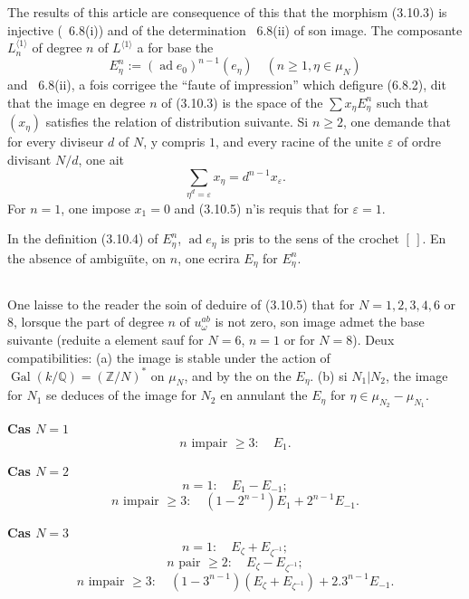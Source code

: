 \documentclass[11pt,a4paper]{article}
\theoremstyle{plain}
\theoremstyle{definition}
\DeclareMathOperator{\Gal}{Gal}
\DeclareMathOperator{\ad}{ad}
\newcommand{\Q}{\mathbb{Q}}
\newcommand{\Z}{\mathbb{Z}}
\begin{document}
The results of this article are consequence of this that the morphism (3.10.3) is injective (\cite{1}~6.8(i)) and of the determination \cite{1}~6.8(ii) of son image. The composante $L^{\langle 1 \rangle}_n$ of degree $n$ of $L^{\langle 1 \rangle}$ a for base the
\begin{equation}\label{eq:3.10.4}
E_\eta^n := (\ad e_0)^{n-1}(e_\eta) \quad (n \geq 1, \eta \in \mu_N)
\end{equation}
and \cite{1}~6.8(ii), a fois corrigee the ``faute of impression'' which defigure (6.8.2), dit that the image en degree $n$ of (3.10.3) is the space of the $\sum x_\eta E_\eta^n$ such that $(x_\eta)$ satisfies the relation of distribution suivante. Si $n \geq 2$, one demande that for every diviseur $d$ of $N$, y compris $1$, and every racine of the unite $\varepsilon$ of ordre divisant $N/d$, one ait
\begin{equation}\label{eq:3.10.5}
\sum_{\eta^d = \varepsilon} x_\eta = d^{n-1} x_\varepsilon.
\end{equation}
For $n=1$, one impose $x_1 = 0$ and (3.10.5) n'is requis that for $\varepsilon = 1$.

In the definition (3.10.4) of $E_\eta^n$, $\ad e_\eta$ is pris to the sens of the crochet $[\,]$. En the absence of ambigu\"{\i}te, on $n$, one ecrira $E_\eta$ for $E_\eta^n$.

\subsection{}
One laisse to the reader the soin of deduire of (3.10.5) that for $N=1,2,3,4,6$ or $8$, lorsque the part of degree $n$ of $u_\omega^{ab}$ is not zero, son image admet the base suivante (reduite a element sauf for $N=6$, $n=1$ or for $N=8$). Deux compatibilities: (a) the image is stable under the action of $\Gal(k/\Q) = (\Z/N)^\ast$ on $\mu_N$, and by the on the $E_\eta$. (b) si $N_1 | N_2$, the image for $N_1$ se deduces of the image for $N_2$ en annulant the $E_\eta$ for $\eta \in \mu_{N_2} - \mu_{N_1}$.

\medskip
\noindent\textbf{Cas $N=1$}
\[
n \text{ impair } \geq 3: \quad E_1.
\]

\medskip
\noindent\textbf{Cas $N=2$}
\[
n=1: \quad E_1 - E_{-1};
\]
\[
n \text{ impair } \geq 3: \quad (1-2^{n-1})E_1 + 2^{n-1}E_{-1}.
\]

\medskip
\noindent\textbf{Cas $N=3$}
\[
n=1: \quad E_\zeta + E_{\zeta^{-1}};
\]
\[
n \text{ pair } \geq 2: \quad E_\zeta - E_{\zeta^{-1}};
\]
\[
n \text{ impair } \geq 3: \quad (1-3^{n-1})(E_\zeta + E_{\zeta^{-1}}) + 2.3^{n-1}E_{-1}.
\]
\end{document}
